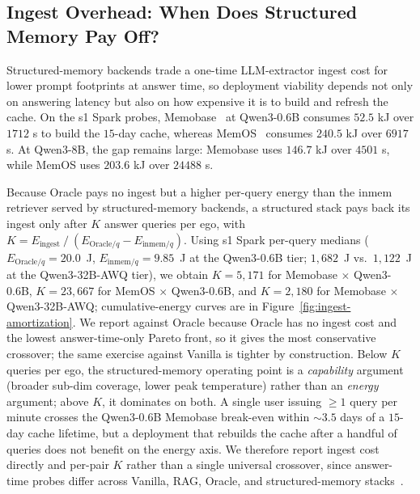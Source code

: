 

\subsection{Ingest Overhead: When Does Structured Memory Pay Off? \texorpdfstring{\cred{[stale: written under deleted F3; pending N\_EGOS=20 deployment rerun]}}{[stale]}}
\label{app:ingest-amortization}

Structured-memory backends trade a one-time LLM-extractor ingest cost for lower prompt footprints at answer time, so deployment viability depends not only on answering latency but also on how expensive it is to build and refresh the cache.
On the s1 Spark probes, Memobase~\citep{memobase2025} at Qwen3-0.6B consumes $52.5$ kJ over $1712$ s to build the $15$-day cache, whereas MemOS~\citep{memos2025} consumes $240.5$ kJ over $6917$ s.
At Qwen3-8B, the gap remains large: Memobase uses $146.7$ kJ over $4501$ s, while MemOS uses $203.6$ kJ over $24488$ s.

Because Oracle pays no ingest but a higher per-query energy than the inmem retriever served by structured-memory backends, a structured stack pays back its ingest only after $K$ answer queries per ego, with
$K = E_{\text{ingest}} \mathbin{/} (E_{\text{Oracle}/q} - E_{\text{inmem}/q})$.
Using s1 Spark per-query medians ($E_{\text{Oracle}/q} = 20.0$~J, $E_{\text{inmem}/q} = 9.85$~J at the Qwen3-0.6B tier; $1{,}682$~J vs.\ $1{,}122$~J at the Qwen3-32B-AWQ tier), we obtain
$K = 5{,}171$ for Memobase $\times$ Qwen3-0.6B,
$K = 23{,}667$ for MemOS $\times$ Qwen3-0.6B, and
$K = 2{,}180$ for Memobase $\times$ Qwen3-32B-AWQ;
cumulative-energy curves are in Figure~\ref{fig:ingest-amortization}.
We report against Oracle because Oracle has no ingest cost and the lowest answer-time-only Pareto front, so it gives the most conservative crossover; the same exercise against Vanilla is tighter by construction.
Below $K$ queries per ego, the structured-memory operating point is a \emph{capability} argument (broader sub-dim coverage, lower peak temperature) rather than an \emph{energy} argument; above $K$, it dominates on both.
A single user issuing $\geq 1$ query per minute crosses the Qwen3-0.6B Memobase break-even within ${\sim}3.5$ days of a $15$-day cache lifetime, but a deployment that rebuilds the cache after a handful of queries does not benefit on the energy axis.
We therefore report ingest cost directly and per-pair $K$ rather than a single universal crossover, since answer-time probes differ across Vanilla, RAG, Oracle, and structured-memory stacks~\citep{kwon2023vllm, bini2025memlora}.


